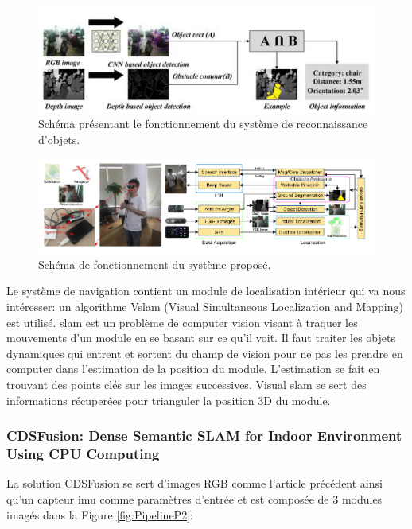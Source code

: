 \documentclass[11pt]{article}
\begin{document}
          \begin{figure}[hbt]  
            \includegraphics[width=\textwidth]{RecognitionP1.png}    
            \caption{Schéma présentant le fonctionnement du système de reconnaissance d'objets.}
            \label{fig:ReconnaissanceP1}
          \end{figure} 

          \begin{figure}[hbt]  
            \includegraphics[width=\textwidth]{PipelineP1.png}    
            \caption{Schéma de fonctionnement du système proposé.}
            \label{fig:PipelineP1}
          \end{figure} 

          Le système de navigation contient un module de localisation intérieur qui va nous intéresser: un algorithme V\acrshort{slam} (Visual Simultaneous 
          Localization and Mapping) est utilisé. \acrshort{slam} est un problème de computer vision visant à traquer les mouvements d'un module en se basant
          sur ce qu'il voit. Il faut traiter les objets dynamiques qui entrent et sortent du champ de vision pour ne pas les prendre en computer
          dans l'estimation de la position du module. L'estimation se fait en trouvant des points clés sur les images successives.  Visual \acrshort{slam}
          se sert des informations récuperées pour trianguler la position 3D du module. 
    
        \pagebreak

        \subsubsection{CDSFusion: Dense Semantic SLAM for Indoor Environment Using CPU Computing}
          La solution CDSFusion \cite{wangCDSFusionDenseSemantic2022} se sert d'images RGB comme l'article précédent ainsi qu'un capteur \acrshort{imu} comme paramètres d'entrée et est composée de 
          3 modules imagés dans la Figure \ref{fig:PipelineP2}:
\end{document}
